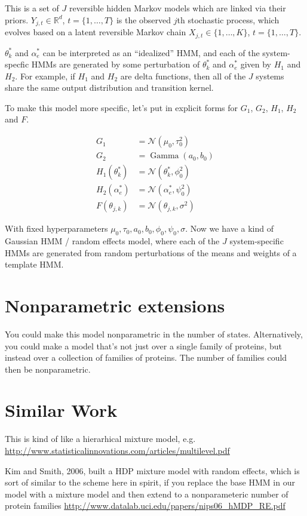 \documentclass[twocolumn,floatfix,nofootinbib,aps]{revtex4-1}
\begin{document}
This is a set of $J$ reversible hidden Markov models which are linked via their priors. $Y_{j,t} \in \mathbb{R}^d$, $t = \{1, \ldots, T\}$ is the observed $j$th stochastic process, which evolves based on a latent reversible Markov chain $X_{j, t} \in \{1, \ldots, K\}$, $t = \{1, \ldots, T\}$.

$\theta^*_k$ and $\alpha^*_e$ can be interpreted as an ``idealized'' HMM, and each of the system-specfic HMMs are generated by some perturbation of $\theta^*_k$ and $\alpha^*_e$ given by $H_1$ and $H_2$. For example, if $H_1$ and $H_2$ are delta functions, then all of the $J$ systems share the same output distribution and transition kernel.

To make this model more specific, let's put in explicit forms for $G_1$, $G_2$, $H_1$, $H_2$ and $F$.


\begin{align}
G_1 & = \mathcal{N}(\mu_0, \tau_0^2) \\
G_2 & = \operatorname{Gamma}(a_0, b_0) \\
H_1(\theta^*_k) & = \mathcal{N}(\theta^*_k, \phi_0^2) \\
H_2(\alpha_e^*) & = \mathcal{N}(\alpha_e^*, \psi^2_0) \\
F(\theta_{j,k}) &= \mathcal{N}(\theta_{j,k}, \sigma^2)
\end{align}

With fixed hyperparameters $\mu_0, \tau_0, a_0, b_0, \phi_0, \psi_0, \sigma$. Now we have a kind of Gaussian HMM / random effects model, where each of the $J$ system-specific HMMs are generated from random perturbations of the means and weights of a template HMM.

\section{Nonparametric extensions}
You could make this model nonparametric in the number of states. Alternatively, you could make a model that's not just over a single family of proteins, but instead over a collection of families of proteins. The number of families could then be nonparametric.

\section{Similar Work}

This is kind of like a hierarhical mixture model, e.g. \url{http://www.statisticalinnovations.com/articles/multilevel.pdf}

Kim and Smith, 2006, built a HDP mixture model with random effects, which is sort of similar to the scheme here in spirit, if you replace the base HMM in our model with a mixture model and then extend to a nonparameteric number of protein families \url{http://www.datalab.uci.edu/papers/nips06_hMDP_RE.pdf}
\end{document}
